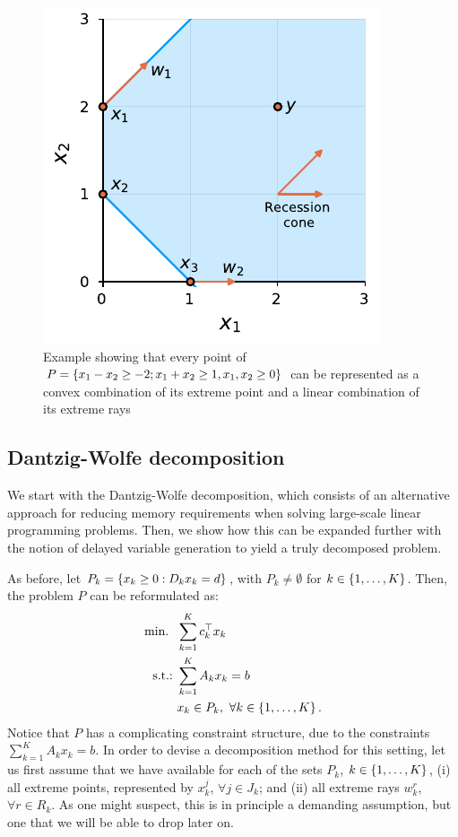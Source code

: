 \begin{figure}[h]
	\includegraphics{part_1/chapter_12/figures/Figure1.pdf}
	\caption{Example showing that every point of $P = \left\{ x_1 - x_2 \geq -2; x_1 + x_2 \geq 1, x_1,x_2 \geq 0 \right \}$ can be represented as a convex combination of its extreme point and a linear combination of its extreme rays} \label{p1c7:fig:resolution_example}
\end{figure}


\subsection{Dantzig-Wolfe decomposition}

We start with the Dantzig-Wolfe decomposition, which consists of an alternative approach for reducing memory requirements when solving large-scale linear programming problems. Then, we show how this can be expanded further with the notion of delayed variable generation to yield a truly decomposed problem.

As before, let $P_k = \left\{ x_k \geq 0 : D_kx_k = d \right \}$, with $P_k \neq \emptyset$ for $k \in \left\{ 1,\dots,K \right \}$. Then, the problem $P$ can be reformulated as:
%
\begin{align*}
	\mathop{\text{min.~}} \ & \sum_{k = 1}^K c_k ^\top x_k 	\\
	\mathop{\text{s.t.:~}} & \sum_{k=1}^K A_k x_k = b \\
	& x_k \in P_k, \ \forall k \in \left\{ 1,\dots,K \right \}. 
\end{align*}
%
Notice that $P$ has a complicating constraint structure, due to the constraints $\sum_{k=1}^K A_k x_k = b$. In order to devise a decomposition method for this setting, let us first assume that we have available for each of the sets $P_k$, $k \in \left\{ 1,\dots,K \right \}$, (i) all extreme points, represented by $x_k^j$, $\forall j \in J_k$; and (ii) all extreme rays $w_k^r$, $\forall r \in R_k$. As one might suspect, this is in principle a demanding assumption, but one that we will be able to drop later on.

